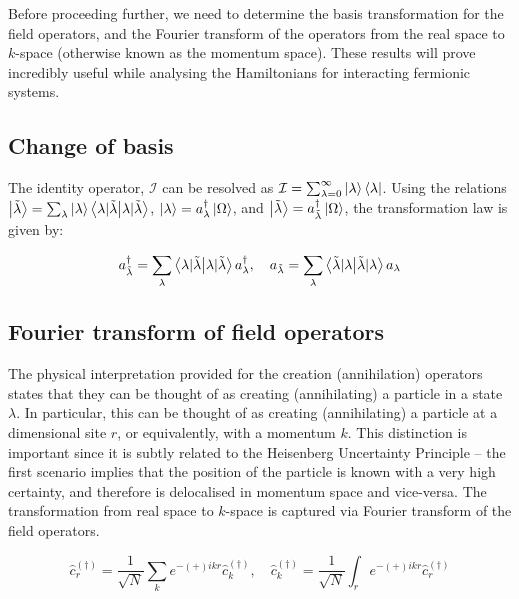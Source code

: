 Before proceeding further, we need to determine the basis transformation for the field operators, and the Fourier transform of the operators from the real space to $k$-space (otherwise known as the momentum space). These results will prove incredibly useful while analysing the Hamiltonians for interacting fermionic systems. \\

\clearpage

\subsection{Change of basis}

The identity operator, $\mathcal{I}$ can be resolved as $\mathcal{I} = \sum_{\lambda=0}^{\infty}\ket{\lambda}\bra{\lambda}$. Using the relations $\ket{\tilde{\lambda}} = \sum_{\lambda}\ket{\lambda}\braket{\lambda|\tilde{\lambda}}$, $\ket{\lambda} = a_{\lambda}^{\dagger}\ket{\Omega}$, and $\ket{\tilde{\lambda}} = a_{\tilde{\lambda}}^{\dagger} \ket{\Omega}$, the transformation law is given by:

\begin{equation}
    a_{\tilde{\lambda}}^{\dagger} = \sum_{\lambda}\braket{\lambda|\tilde{\lambda}}a_{\lambda}^{\dagger}, \quad a_{\tilde{\lambda}} = \sum_{\lambda}\braket{\tilde{\lambda}|\lambda}a_{\lambda}
\end{equation}

\subsection{Fourier transform of field operators}

The physical interpretation provided for the creation (annihilation) operators states that they can be thought of as creating (annihilating) a particle in a state $\lambda$. In particular, this can be thought of as creating (annihilating) a particle at a dimensional site $r$, or equivalently, with a momentum $k$. This distinction is important since it is subtly related to the Heisenberg Uncertainty Principle -- the first scenario implies that the position of the particle is known with a very high certainty, and therefore is delocalised in momentum space and vice-versa. The transformation from real space to $k$-space is captured via Fourier transform of the field operators.

\begin{equation}
    \hat{c}_{r}^{(\dagger)} = \frac{1}{\sqrt{N}}\sum_{k}e^{-(+)ikr} \hat{c}_{k}^{(\dagger)}, \quad \hat{c}_{k}^{(\dagger)} = \frac{1}{\sqrt{N}}\int_{r}e^{-(+)ikr} \hat{c}_{r}^{(\dagger)}
\end{equation}

